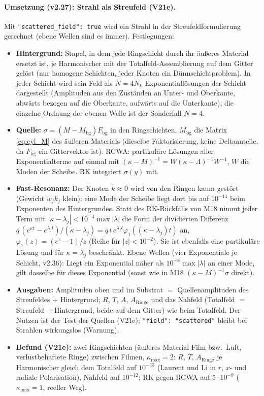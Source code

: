 \paragraph{Umsetzung (v2.27): Strahl als Streufeld (V21e).}
Mit \verb|"scattered_field": true| wird ein Strahl in der Streufeldformulierung gerechnet (ebene Wellen sind es immer).
Festlegungen:
\begin{itemize}[nosep]
  \item \textbf{Hintergrund:} Stapel, in dem jede Ringschicht durch ihr äußeres Material ersetzt ist, je Harmonischer mit
        der Totalfeld-Assemblierung auf dem Gitter gelöst (nur homogene Schichten, jeder Knoten ein Dünnschichtproblem).
        In jeder Schicht wird sein Feld als $N=4N_k$ Exponentiallösungen der Schicht dargestellt (Amplituden aus den
        Zuständen an Unter- und Oberkante, abwärts bezogen auf die Oberkante, aufwärts auf die Unterkante); die
        einzelne Ordnung der ebenen Welle ist der Sonderfall $N=4$.
  \item \textbf{Quelle:} $\sigma=(M-M_{\text{bg}})F_{\text{bg}}$ in den Ringschichten, $M_{\text{bg}}$ die Matrix
        \eqref{eq:cyl_M} des äußeren Materials (dieselbe Faktorisierung, keine Deltaanteile, da $F_{\text{bg}}$ ein
        Gittervektor ist). RCWA: partikuläre Lösungen aller Exponentialterme auf einmal mit
        $(\kappa-M)^{-1}=W(\kappa-\Lambda)^{-1}W^{-1}$, $W$ die Moden der Scheibe. RK integriert $\sigma(y)$ mit.
  \item \textbf{Fast-Resonanz:} Der Knoten $k\approx0$ wird von den Ringen kaum gestört (Gewicht $w_jk_j$ klein): eine
        Mode der Scheibe liegt dort bis auf $10^{-14}$ beim Exponenten des Hintergrundes. Statt des RK-Rückfalls von M18
        nimmt jeder Term mit $|\kappa-\lambda_j|<10^{-4}\max|\lambda|$ die Form der dividierten Differenz
        $q\,(e^{\kappa t}-e^{\lambda_jt})/(\kappa-\lambda_j)=q\,t\,e^{\lambda_jt}\varphi_1((\kappa-\lambda_j)t)$ an,
        $\varphi_1(z)=(e^z-1)/z$ (Reihe für $|z|<10^{-2}$). Sie ist ebenfalls eine partikuläre Lösung und für
        $\kappa=\lambda_j$ beschränkt. Ebene Wellen (vier Exponentiale je Schicht, v2.36): Liegt ein Exponential
        näher als $10^{-8}\max|\lambda|$ an einer Mode, gilt dasselbe für dieses Exponential (sonst wie in M18
        $(\kappa-M)^{-1}\sigma$ direkt).
  \item \textbf{Ausgaben:} Amplituden oben und im Substrat $=$ Quellenamplituden des Streufeldes $+$ Hintergrund; $R$,
        $T$, $A$, $A_{\text{Ringe}}$ und das Nahfeld (Totalfeld $=$ Streufeld $+$ Hintergrund, beide auf dem Gitter) wie
        beim Totalfeld. Der Nutzen ist der Test der Quellen (V21e); \verb|"field": "scattered"| bleibt bei Strahlen
        wirkungslos (Warnung).
  \item \textbf{Befund (V21e):} zwei Ringschichten (äußeres Material Film bzw.\ Luft, verlustbehaftete Ringe) zwischen
        Filmen, $\kappa_{\max}=2$: $R$, $T$, $A_{\text{Ringe}}$ je Harmonischer gleich dem Totalfeld auf $10^{-13}$
        (Laurent und Li in $r$, $x$- und radiale Polarisation), Nahfeld auf $10^{-12}$; RK gegen RCWA auf $5\cdot10^{-9}$
        ($\kappa_{\max}=1$, reeller Weg).
\end{itemize}

